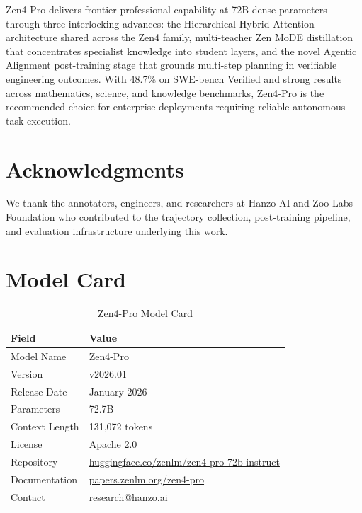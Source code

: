 \documentclass[11pt,a4paper]{article}
\begin{document}
Zen4-Pro delivers frontier professional capability at 72B dense parameters through three
interlocking advances: the Hierarchical Hybrid Attention architecture shared across the
Zen4 family, multi-teacher Zen MoDE distillation that concentrates specialist knowledge
into student layers, and the novel Agentic Alignment post-training stage that grounds
multi-step planning in verifiable engineering outcomes. With 48.7\% on SWE-bench Verified
and strong results across mathematics, science, and knowledge benchmarks, Zen4-Pro is the
recommended choice for enterprise deployments requiring reliable autonomous task execution.

\section*{Acknowledgments}

We thank the annotators, engineers, and researchers at Hanzo AI and Zoo Labs Foundation
who contributed to the trajectory collection, post-training pipeline, and evaluation
infrastructure underlying this work.




\appendix

\section{Model Card}

\begin{table}[H]
\centering
\begin{tabular}{ll}
\toprule
\textbf{Field} & \textbf{Value} \\
\midrule
Model Name      & Zen4-Pro \\
Version         & v2026.01 \\
Release Date    & January 2026 \\
Parameters      & 72.7B \\
Context Length  & 131,072 tokens \\
License         & Apache 2.0 \\
Repository      & \href{https://huggingface.co/zenlm/zen4-pro-72b-instruct}{huggingface.co/zenlm/zen4-pro-72b-instruct} \\
Documentation   & \href{https://papers.zenlm.org/zen4-pro}{papers.zenlm.org/zen4-pro} \\
Contact         & research@hanzo.ai \\
\bottomrule
\end{tabular}
\caption{Zen4-Pro Model Card}
\end{table}
\end{document}
